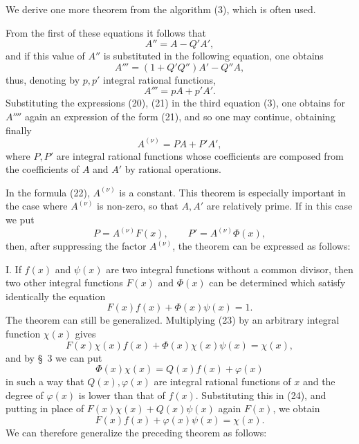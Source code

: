 \documentclass[11pt]{article}
\begin{document}
We derive one more theorem from the algorithm (3), which is often used.

From the first of these equations it follows that
\begin{equation}
 A''=A-Q'A',
\tag{20}
\end{equation}
and if this value of $A''$ is substituted in the following equation, one obtains
\[
 A'''=(1+Q'Q'')A'-Q''A,
\]
thus, denoting by $p,p'$ integral rational functions,
\begin{equation}
 A'''=pA+p'A'.
\tag{21}
\end{equation}
Substituting the expressions (20), (21) in the third equation (3), one obtains for $A''''$ again an expression of the form (21), and so one may continue, obtaining finally
\begin{equation}
 A^{(\nu)}=PA+P'A',
\tag{22}
\end{equation}
where $P,P'$ are integral rational functions whose coefficients are composed from the coefficients of $A$ and $A'$ by rational operations.

In the formula (22), $A^{(\nu)}$ is a constant. This theorem is especially important in the case where $A^{(\nu)}$ is non-zero, so that $A,A'$ are relatively prime. If in this case we put
\[
 P=A^{(\nu)}F(x),
 \qquad
 P'=A^{(\nu)}\Phi(x),
\]
then, after suppressing the factor $A^{(\nu)}$, the theorem can be expressed as follows:

I. If $f(x)$ and $\psi(x)$ are two integral functions without a common divisor, then two other integral functions $F(x)$ and $\Phi(x)$ can be determined which satisfy identically the equation
\begin{equation}
 F(x)f(x)+\Phi(x)\psi(x)=1.
\tag{23}
\end{equation}
The theorem can still be generalized. Multiplying (23) by an arbitrary integral function $\chi(x)$ gives
\begin{equation}
 F(x)\chi(x)f(x)+\Phi(x)\chi(x)\psi(x)=\chi(x),
\tag{24}
\end{equation}
and by \S~3 we can put
\begin{equation}
 \Phi(x)\chi(x)=Q(x)f(x)+\varphi(x)
\tag{25}
\end{equation}
in such a way that $Q(x),\varphi(x)$ are integral rational functions of $x$ and the degree of $\varphi(x)$ is lower than that of $f(x)$. Substituting this in (24), and putting in place of $F(x)\chi(x)+Q(x)\psi(x)$ again $F(x)$, we obtain
\[
 F(x)f(x)+\varphi(x)\psi(x)=\chi(x).
\]
We can therefore generalize the preceding theorem as follows:
\end{document}
